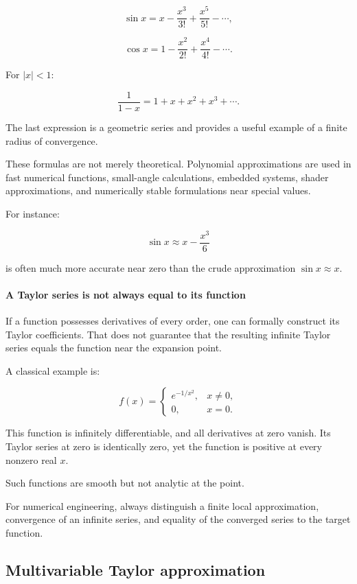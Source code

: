 \[
\sin x= x-\frac{x^3}{3!}+\frac{x^5}{5!}-\cdots,
\]

\[
\cos x= 1-\frac{x^2}{2!}+\frac{x^4}{4!}-\cdots.
\]

For \(|x|<1\):

\[
\frac1{1-x} = 1+x+x^2+x^3+\cdots.
\]

The last expression is a geometric series and provides a useful example of a finite radius of convergence.

These formulas are not merely theoretical. Polynomial approximations are used in fast numerical functions, small-angle calculations, embedded systems, shader approximations, and numerically stable formulations near special values.

For instance:

\[
\sin x\approx x-\frac{x^3}{6}
\]

is often much more accurate near zero than the crude approximation \(\sin x\approx x\).

\paragraph{A Taylor series is not always equal to its function}\label{02-foundations-ii-ch021-a-taylor-series-is-not-always-equal-to-its-function}

\hypertarget{02-foundations-ii-ch021-a-taylor-series-is-not-always-equal-to-its-function}{}

If a function possesses derivatives of every order, one can formally construct its Taylor coefficients. That does not guarantee that the resulting infinite Taylor series equals the function near the expansion point.

A classical example is:

\[
f(x)= \begin{cases} e^{-1/x^2},&x\ne0,\\ 0,&x=0. \end{cases}
\]

This function is infinitely differentiable, and all derivatives at zero vanish. Its Taylor series at zero is identically zero, yet the function is positive at every nonzero real \(x\).

Such functions are smooth but not analytic at the point.

For numerical engineering, always distinguish a finite local approximation, convergence of an infinite series, and equality of the converged series to the target function.

\subsection{Multivariable Taylor approximation}\label{02-foundations-ii-ch021-multivariable-taylor-approximation}

